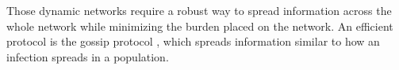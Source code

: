 \documentclass[journal]{IEEEtran}
\begin{document}

Those dynamic networks require a robust way to spread information across the whole network while minimizing the burden placed on the network. An efficient protocol is the gossip protocol \cite{gossip}, which spreads information similar to how an infection spreads in a population.






%
%

\end{document}
